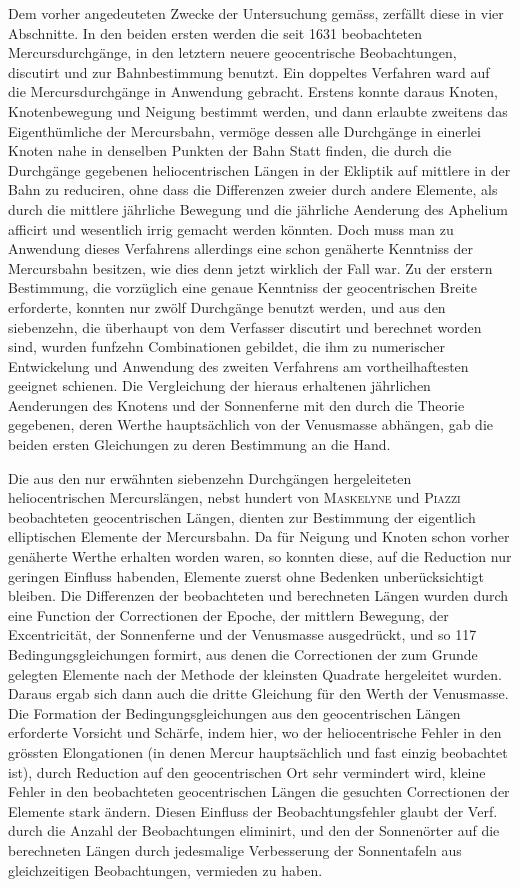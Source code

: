 Dem vorher angedeuteten Zwecke der Untersuchung gemäss, zerfällt diese in vier Abschnitte. In den beiden ersten werden die seit 1631 beobachteten Mercursdurchgänge, in den letztern neuere geocentrische Beobachtungen, discutirt und zur Bahnbestimmung benutzt. Ein doppeltes Verfahren ward auf die Mercursdurchgänge in Anwendung gebracht. Erstens konnte daraus Knoten, Knotenbewegung und Neigung bestimmt werden, und dann erlaubte zweitens das Eigenthümliche der Mercursbahn, vermöge dessen alle Durchgänge in einerlei Knoten nahe in denselben Punkten der Bahn Statt finden, die durch die Durchgänge gegebenen heliocentrischen Längen in der Ekliptik auf mittlere in der Bahn zu reduciren, ohne dass die Differenzen zweier durch andere Elemente, als durch die mittlere jährliche Bewegung und die jährliche Aenderung des Aphelium afficirt und wesentlich irrig gemacht werden könnten. Doch muss man zu Anwendung dieses Verfahrens allerdings eine schon genäherte Kenntniss der Mercursbahn besitzen, wie dies denn jetzt wirklich der Fall war. Zu der erstern Bestimmung, die vorzüglich eine genaue Kenntniss der geocentrischen Breite erforderte, konnten nur zwölf Durchgänge benutzt werden, und aus den siebenzehn, die überhaupt von dem Verfasser discutirt und berechnet worden sind, wurden funfzehn Combinationen gebildet, die ihm zu numerischer Entwickelung und Anwendung des zweiten Verfahrens am vortheilhaftesten geeignet schienen. Die Vergleichung der hieraus erhaltenen jährlichen Aenderungen des Knotens und der Sonnenferne mit den durch die Theorie gegebenen, deren Werthe hauptsächlich von der Venusmasse abhängen, gab die beiden ersten Gleichungen zu deren Bestimmung an die Hand.

Die aus den nur erwähnten siebenzehn Durchgängen hergeleiteten heliocentrischen Mercurslängen, nebst hundert von \textsc{Maskelyne} und \textsc{Piazzi} beobachteten geocentrischen Längen, dienten zur Bestimmung der eigentlich elliptischen Elemente der Mercursbahn. Da für Neigung und Knoten schon vorher genäherte Werthe erhalten worden waren, so konnten diese, auf die Reduction nur geringen Einfluss habenden, Elemente zuerst ohne Bedenken unberücksichtigt bleiben. Die Differenzen der beobachteten und berechneten Längen wurden durch eine Function der Correctionen der Epoche, der mittlern Bewegung, der Excentricität, der Sonnenferne und der Venusmasse ausgedrückt, und so 117 Bedingungsgleichungen formirt, aus denen die Correctionen der zum Grunde gelegten Elemente nach der Methode der kleinsten Quadrate hergeleitet wurden. Daraus ergab sich dann auch die dritte Gleichung für den Werth der Venusmasse. Die Formation der Bedingungsgleichungen aus den geocentrischen Längen erforderte Vorsicht und Schärfe, indem hier, wo der heliocentrische Fehler in den grössten Elongationen (in denen Mercur hauptsächlich und fast einzig beobachtet ist), durch Reduction auf den geocentrischen Ort sehr vermindert wird, kleine Fehler in den beobachteten geocentrischen Längen die gesuchten Correctionen der Elemente stark ändern. Diesen Einfluss der Beobachtungsfehler glaubt der Verf. durch die Anzahl der Beobachtungen eliminirt, und den der Sonnenörter auf die berechneten Längen durch jedesmalige Verbesserung der Sonnentafeln aus gleichzeitigen Beobachtungen, vermieden zu haben.

